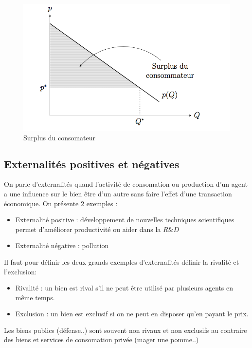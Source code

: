 \begin{figure}[h]
\begin{center}
\includegraphics[scale=0.7]{./img/IM1}
\caption{Surplus du consomateur}
\end{center}
\end{figure}



\subsection{Externalités positives et négatives} %
\label{sub:externalites_positives_et_negatives}

On parle d'externalités quand l'activité de consomation ou production d'un agent a une influence sur le bien être d'un autre sans faire l'effet d'une transaction économique. On présente 2 exemples :
\begin{itemize}
	\item Externalité positive : développement de nouvelles techniques scientifiques permet d'améliorer productivité ou aider dans la $R\&D$
	\item Externalité négative : pollution
\end{itemize}

Il faut pour définir les deux grands exemples d'externalités définir la rivalité et l'exclusion: 
\begin{itemize}
	\item Rivalité : un bien est rival s'il ne peut être utilisé par plusieurs agents en même temps.
	\item Exclusion : un bien est exclusif si on ne peut en disposer qu'en payant le prix.
\end{itemize}
Les biens publics (défense..) sont souvent non rivaux et non exclusifs au contraire des biens et services de consomation privée (mager une pomme..)

